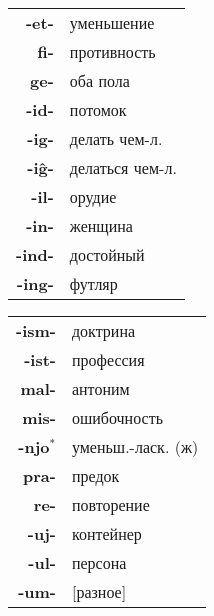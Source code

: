 \documentclass{article}
\begin{document}
\begin{tabular}{>{\bfseries}rl}
-et- & уменьшение \\
fi- & противность \\
ge- & оба пола \\
-id- & потомок \\
-ig- & делать чем-л. \\
-iĝ- & делаться чем-л. \\
-il- & орудие \\
-in- & женщина \\
-ind- & достойный \\
-ing- & футляр \\
\end{tabular}
\begin{tabular}{>{\bfseries}rl}
-ism- & доктрина \\
-ist- & профессия \\
mal- & антоним \\
mis- & ошибочность \\
-njo$^*$ & уменьш.-ласк. (ж) \\
pra- & предок \\
re- & повторение \\
-uj- & контейнер \\
-ul- & персона \\
-um- & [разное] \\
\end{tabular}
\end{document}
